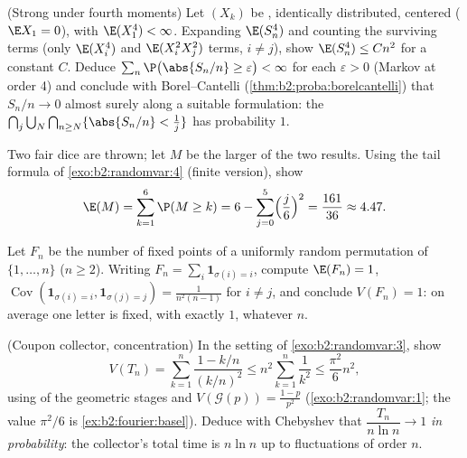 \begin{exercise}[$\star\star\star$]\label{exo:b2:randomvar:9}
(Strong  under fourth moments) Let $(X_k)$ be ,
identically distributed, centered ($\E X_1 = 0$), with
$\E(X_1^4) < \infty$. Expanding $\E(S_n^4)$ and counting the
surviving terms (only $\E(X_i^4)$ and $\E(X_i^2X_j^2)$ terms, $i
\neq j$), show $\E(S_n^4) \leq C n^2$ for a constant $C$. Deduce
$\sum_n \P\bigl(\abs{S_n/n} \geq \varepsilon\bigr) < \infty$
for each $\varepsilon > 0$ (Markov at order 4) and conclude with
Borel--Cantelli (\cref{thm:b2:proba:borelcantelli}) that
$S_n/n \to 0$ almost surely along a suitable formulation: the
 $\bigcap_{j}\bigcup_N\bigcap_{n \geq N}\{\abs{S_n/n} <
\frac1j\}$ has probability $1$.
\end{exercise}

\begin{exercise}[$\star$]\label{exo:b2:randomvar:10}
Two fair dice are thrown; let $M$ be the larger of the two
results. Using the tail formula of \cref{exo:b2:randomvar:4}
(finite version), show
\[
\E(M) = \sum_{k=1}^{6}\P(M \geq k)
= 6 - \sum_{j=0}^5\Bigl(\frac j6\Bigr)^2 = \frac{161}{36}
\approx 4.47 .
\]
\end{exercise}

\begin{exercise}[$\star\star$]\label{exo:b2:randomvar:11}
Let $F_n$ be the number of fixed points of a uniformly random
permutation of $\{1, \dots, n\}$ ($n \geq 2$). Writing $F_n =
\sum_i\mathbf 1_{\sigma(i) = i}$, compute $\E(F_n) = 1$,
$\operatorname{Cov}(\mathbf 1_{\sigma(i)=i}, \mathbf
1_{\sigma(j)=j}) = \frac1{n^2(n-1)}$ for $i \neq j$, and
conclude $V(F_n) = 1$: on average one letter is fixed, with
 exactly $1$, whatever $n$.
\end{exercise}

\begin{exercise}[$\star\star\star$]\label{exo:b2:randomvar:12}
(Coupon collector, concentration) In the setting of
\cref{exo:b2:randomvar:3}, show
\[
V(T_n) = \sum_{k=1}^n\frac{1 - k/n}{(k/n)^2}
\leq n^2\sum_{k=1}^n\frac{1}{k^2} \leq \frac{\pi^2}{6}n^2,
\]
using  of the geometric stages and $V(\mathcal
G(p)) = \frac{1-p}{p^2}$ (\cref{exo:b2:randomvar:1}; the value
$\pi^2/6$ is \cref{ex:b2:fourier:basel}). Deduce with
Chebyshev that $\dfrac{T_n}{n\ln n} \to 1$ \emph{in
probability}: the collector's total time is $n\ln n$ up to
fluctuations of order $n$.
\end{exercise}

